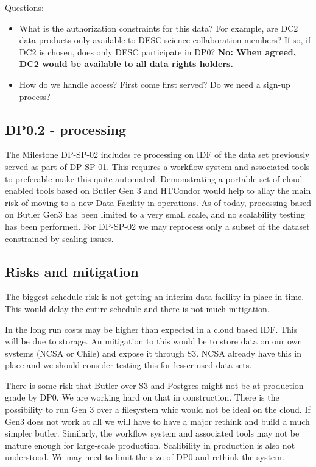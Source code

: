 Questions:

\begin{itemize}

\item What is the authorization constraints for this data? For example, are DC2 data products only available to DESC science collaboration members? If so, if DC2 is chosen, does only DESC participate in DP0?
	{\bf No: When agreed, DC2 would be available to all data rights holders.}

\item How do we handle access? First come first served? Do we need a sign-up process?

\end{itemize}

\subsection{DP0.2 - processing}

The Milestone DP-SP-02 includes re processing on IDF of the data set previously served as part of DP-SP-01.
This requires a workflow system and associated tools to preferable make this quite automated.
Demonstrating a portable set of cloud enabled tools based on Butler Gen 3 and HTCondor would help to allay the main risk of moving to a new Data Facility in operations.
As of today, processing based on Butler Gen3 has been limited to a very small scale, and no scalability testing has been performed. For DP-SP-02 we may reprocess only a subset of the dataset constrained by scaling issues.


\subsection{Risks and mitigation}

The biggest schedule risk is not getting an interim data facility in place in time.
This would delay the entire schedule and there is not much mitigation.

In the long run costs may be higher than expected in a cloud based IDF. This will be due to storage.
An mitigation to this would be to store data on our own systems (NCSA or Chile) and expose it through S3.
NCSA already have this in place and we should consider testing this for lesser used data sets.

There is some risk that  Butler over S3 and Postgres  might not be at  production grade by DP0. We are working hard on that in construction. There is the possibility to run Gen 3 over a filesystem whic would not be ideal on the cloud. If Gen3 does not work at all we will have to have a major rethink and build a much simpler butler.
Similarly, the workflow system and associated tools may not be mature enough for large-scale production. Scalibility in production is also not understood. We may need to limit the size of DP0 and rethink the system.
